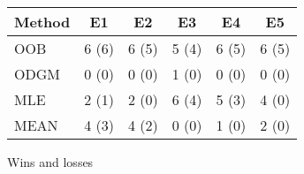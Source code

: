 \vspace{.16\textwidth}
\begin{center}
\begin{tabular}{lccccc}
\hline
Method & E1    & E2    & E3    & E4    & E5    \\\hline
OOB    & 6 (6) & 6 (5) & 5 (4) & 6 (5) & 6 (5) \\
ODGM   & 0 (0) & 0 (0) & 1 (0) & 0 (0) & 0 (0) \\\hline
MLE    & 2 (1) & 2 (0) & 6 (4) & 5 (3) & 4 (0) \\
MEAN   & 4 (3) & 4 (2) & 0 (0) & 1 (0) & 2 (0) \\\hline
\end{tabular}
\caption{Wins and losses\label{t:winloss}}
\end{center}
